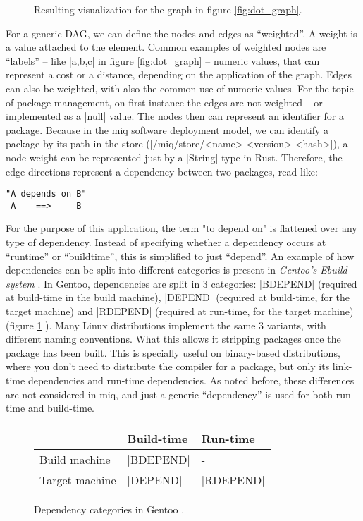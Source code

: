 \begin{figure}[hbtp]
    \centerfloat
    
    \caption{Resulting visualization for the graph in figure \ref{fig:dot_graph}.}
\end{figure}

For a generic \ac{DAG}, we can define the nodes and edges as
``weighted''. A weight is a value attached to the element.
Common examples of weighted nodes are ``labels'' -- like
|a,b,c| in figure \ref{fig:dot_graph} -- numeric values,
that can represent a cost or a distance, depending on the
application of the graph. Edges can also be weighted, with
also the common use of numeric values. For the topic of
package management, on first instance the edges are not
weighted -- or implemented as a |null| value. The nodes then
can represent an identifier for a package. Because in the
miq software deployment model, we can identify a package by
its path in the store
(|/miq/store/<name>-<version>-<hash>|), a node weight can be
represented just by a |String| type in Rust. Therefore, the
edge directions represent a dependency between two packages,
read like:

\begin{verbatim}
"A depends on B"
 A    ==>     B
\end{verbatim}

For the purpose of this application, the term "to depend on"
is flattened over any type of dependency. Instead of
specifying whether a dependency occurs at ``runtime'' or
``buildtime'', this is simplified to just ``depend''. An
example of how dependencies can be split into different
categories is present in \textit{Gentoo's Ebuild system}
\cite{DependenciesGentooDevelopment}. In Gentoo,
dependencies are split in 3 categories: |BDEPEND| (required
at build-time in the build machine), |DEPEND| (required at
build-time, for the target machine) and |RDEPEND| (required
at run-time, for the target machine) (figure \ref{fig:dep_categories} ). Many Linux
distributions implement the same 3 variants, with different
naming conventions. What this allows it stripping packages
once the package has been built. This is specially useful on
binary-based distributions, where you don't need to
distribute the compiler for a package, but only its
link-time dependencies and run-time dependencies. As noted
before, these differences are not considered in miq, and
just a generic ``dependency'' is used for both run-time and build-time.

\begin{figure}[hbtp]
    \centerfloat
    \begin{tabular}{lll}
        \hline
        & Build-time & Run-time \\
        \hline
        Build machine & |BDEPEND| & - \\
        Target machine & |DEPEND| & |RDEPEND| \\
        \hline
    \end{tabular}
    \caption{Dependency categories in Gentoo \cite{DependenciesGentooDevelopment} .}
    \label{fig:dep_categories}
\end{figure}

